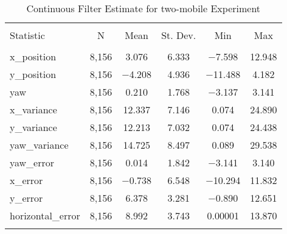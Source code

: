 
\begin{table}[h] \centering 
  \caption{Continuous Filter Estimate for two-mobile Experiment} 
  \label{tab:two_mobile_continuous_summary} 
\begin{tabular}{@{\extracolsep{5pt}}lccccc} 
\\[-1.8ex]\hline 
\hline \\[-1.8ex] 
Statistic & \multicolumn{1}{c}{N} & \multicolumn{1}{c}{Mean} & \multicolumn{1}{c}{St. Dev.} & \multicolumn{1}{c}{Min} & \multicolumn{1}{c}{Max} \\ 
\hline \\[-1.8ex] 
x\_position & 8,156 & 3.076 & 6.333 & $-$7.598 & 12.948 \\ 
y\_position & 8,156 & $-$4.208 & 4.936 & $-$11.488 & 4.182 \\ 
yaw & 8,156 & 0.210 & 1.768 & $-$3.137 & 3.141 \\ 
x\_variance & 8,156 & 12.337 & 7.146 & 0.074 & 24.890 \\ 
y\_variance & 8,156 & 12.213 & 7.032 & 0.074 & 24.438 \\ 
yaw\_variance & 8,156 & 14.725 & 8.497 & 0.089 & 29.538 \\ 
yaw\_error & 8,156 & 0.014 & 1.842 & $-$3.141 & 3.140 \\ 
x\_error & 8,156 & $-$0.738 & 6.548 & $-$10.294 & 11.832 \\ 
y\_error & 8,156 & 6.378 & 3.281 & $-$0.890 & 12.651 \\ 
horizontal\_error & 8,156 & 8.992 & 3.743 & 0.00001 & 13.870 \\ 
\hline \\[-1.8ex] 
\end{tabular} 
\end{table} 
